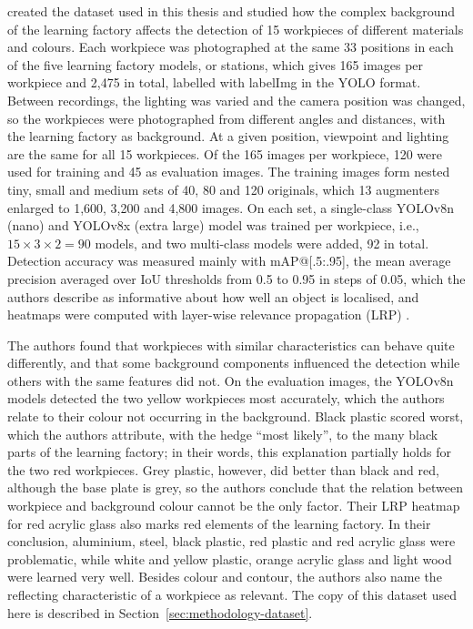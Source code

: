 \citet*{schneidereitYOLOv8} created the dataset
used in this thesis and studied how the complex background of the learning factory
affects the detection of 15 workpieces of different materials and colours. Each
workpiece was photographed at the same 33 positions in each of the five learning factory
models, or stations, which gives 165 images per workpiece and 2,475 in total, labelled
with labelImg in the YOLO format. Between recordings, the lighting was varied and the
camera position was changed, so the workpieces were photographed from different angles
and distances, with the learning factory as background. At a given position, viewpoint
and lighting are the same for all 15 workpieces. Of the 165 images per workpiece, 120
were used for training and 45 as evaluation images. The training images form nested
tiny, small and medium sets of 40, 80 and 120 originals, which 13 augmenters enlarged to
1,600, 3,200 and 4,800 images. On each set, a single-class YOLOv8n (nano) and YOLOv8x
(extra large) model was trained per workpiece, i.e., $15 \times 3 \times 2 = 90$ models,
and two multi-class models were added, 92 in total. Detection accuracy was measured
mainly with mAP@[.5:.95], the mean average precision averaged over IoU thresholds from
0.5 to 0.95 in steps of 0.05, which the authors describe as informative about how well an object is
localised, and heatmaps were computed with
layer-wise relevance propagation (LRP) \citep{bach2015lrp, montavon2019lrp}.

The authors found that workpieces with similar characteristics can behave quite
differently, and that some background components influenced the detection while others
with the same features did not. On the evaluation images, the YOLOv8n models detected
the two yellow workpieces most accurately, which the authors relate to their colour not occurring in the
background. Black plastic scored worst, which the authors attribute, with the hedge
``most likely'', to the many black parts of the learning factory; in their words, this
explanation partially holds for the two red workpieces.
Grey plastic, however, did better than black and red, although the base plate is grey,
so the authors conclude that the relation between workpiece and background colour cannot
be the only factor. Their LRP heatmap for red acrylic glass also marks red elements of
the learning factory. In their conclusion, aluminium, steel, black plastic, red plastic
and red acrylic glass were problematic, while white and yellow plastic, orange acrylic
glass and light wood were learned very well. Besides colour and contour, the authors also
name the reflecting characteristic of a workpiece as relevant. The copy of this dataset used here
is described in Section~\ref{sec:methodology-dataset}.

